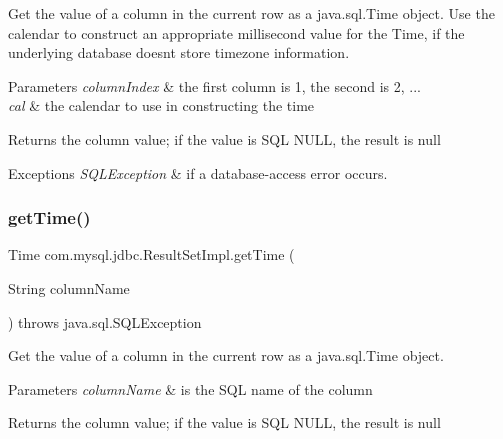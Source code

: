 Get the value of a column in the current row as a java.\+sql.\+Time object. Use the calendar to construct an appropriate millisecond value for the Time, if the underlying database doesn\textquotesingle{}t store timezone information.


\begin{DoxyParams}{Parameters}
{\em column\+Index} & the first column is 1, the second is 2, ... \\
\hline
{\em cal} & the calendar to use in constructing the time\\
\hline
\end{DoxyParams}
\begin{DoxyReturn}{Returns}
the column value; if the value is S\+QL N\+U\+LL, the result is null
\end{DoxyReturn}

\begin{DoxyExceptions}{Exceptions}
{\em S\+Q\+L\+Exception} & if a database-\/access error occurs. \\
\hline
\end{DoxyExceptions}
\mbox{\label{classcom_1_1mysql_1_1jdbc_1_1_result_set_impl_a1ef88fb26be60b7e950e8f34426d3a55}} 
\subsubsection{\texorpdfstring{get\+Time()}{getTime()}\hspace{0.1cm}{\footnotesize\ttfamily [3/4]}}
{\footnotesize\ttfamily Time com.\+mysql.\+jdbc.\+Result\+Set\+Impl.\+get\+Time (\begin{DoxyParamCaption}\item[{String}]{column\+Name }\end{DoxyParamCaption}) throws java.\+sql.\+S\+Q\+L\+Exception}

Get the value of a column in the current row as a java.\+sql.\+Time object.


\begin{DoxyParams}{Parameters}
{\em column\+Name} & is the S\+QL name of the column\\
\hline
\end{DoxyParams}
\begin{DoxyReturn}{Returns}
the column value; if the value is S\+QL N\+U\+LL, the result is null
\end{DoxyReturn}

